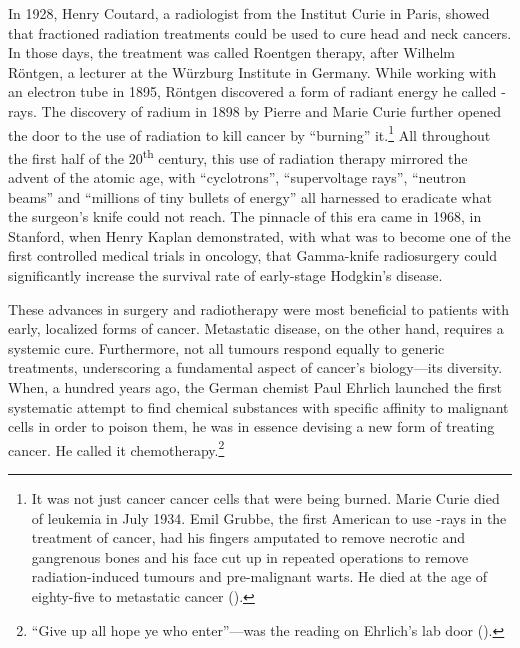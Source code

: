 In 1928, Henry Coutard, a radiologist from the Institut Curie in Paris, showed
that fractioned radiation treatments could be used to cure head and neck
cancers.\cite{coutard_roentgen_1932} In those days, the treatment was called
Roentgen therapy, after Wilhelm Röntgen, a lecturer at the Würzburg Institute in
Germany.  While working with an electron tube in 1895, Röntgen discovered a form
of radiant energy he called -rays.  The discovery of radium in 1898
by Pierre and Marie Curie further opened the door to the use of radiation to
kill cancer by ``burning'' it.\footnote{It was not just cancer cancer cells that
  were being burned.  Marie Curie died of leukemia in July 1934.  Emil Grubbe,
  the first American to use -rays in the treatment of cancer, had
  his fingers amputated to remove necrotic and gangrenous bones and his face cut
  up in repeated operations to remove \mbox{radiation-induced} tumours and
  \mbox{pre-malignant} warts. He died at the age of eighty-five to metastatic
  cancer (\citealp{mukherjee_emperor_2011}).}  All throughout the first half of
the 20\textsuperscript{th} century, this use of radiation therapy mirrored the
advent of the atomic age, with ``cyclotrons'', ``supervoltage rays'', ``neutron
beams'' and ``millions of tiny bullets of energy'' all harnessed to eradicate
what the surgeon's knife could not reach.\cite{mukherjee_emperor_2011} The
pinnacle of this era came in 1968, in Stanford, when Henry Kaplan demonstrated,
with what was to become one of the first controlled medical trials in oncology,
that \mbox{Gamma-knife} radiosurgery could significantly increase the survival
rate of early-stage Hodgkin's disease.\cite{kaplan_clinical_1968}

These advances in surgery and radiotherapy were most beneficial to patients with
early, localized forms of cancer.  Metastatic disease, on the other hand,
requires a systemic cure.  Furthermore, not all tumours respond equally to
generic treatments, underscoring a fundamental aspect of cancer's biology---its
diversity.  When, a hundred years ago, the German chemist Paul Ehrlich
launched the first systematic attempt to find chemical substances with specific
affinity to malignant cells in order to poison them, he was in essence devising
a new form of treating cancer. He called it chemotherapy.\footnote{``Give up all
  hope ye who enter''---was the reading on Ehrlich's lab door
  (\citealp{devita_history_2008}).}

